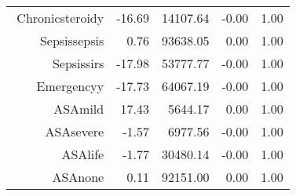 \begin{tabular}{rrrrr}
$$  Chronic\-steroid\-y & -16.69 & 14107.64 & -0.00 & 1.00 \\ 
  Sepsis\-sepsis & 0.76 & 93638.05 & 0.00 & 1.00 \\ 
  Sepsis\-sirs & -17.98 & 53777.77 & -0.00 & 1.00 \\ 
  Emergency\-y & -17.73 & 64067.19 & -0.00 & 1.00 \\ 
  ASA\-mild & 17.43 & 5644.17 & 0.00 & 1.00 \\ 
  ASA\-severe & -1.57 & 6977.56 & -0.00 & 1.00 \\ 
  ASA\-life & -1.77 & 30480.14 & -0.00 & 1.00 \\ 
  ASA\-none & 0.11 & 92151.00 & 0.00 & 1.00 \\ 
   \hline
\end{tabular}

